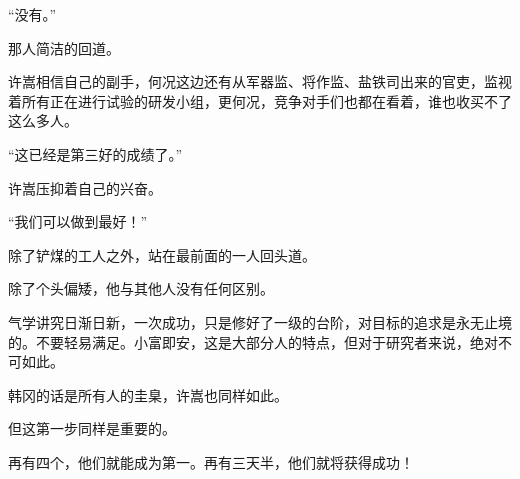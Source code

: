 “没有。”

那人简洁的回道。

许嵩相信自己的副手，何况这边还有从军器监、将作监、盐铁司出来的官吏，监视着所有正在进行试验的研发小组，更何况，竞争对手们也都在看着，谁也收买不了这么多人。

“这已经是第三好的成绩了。”

许嵩压抑着自己的兴奋。

“我们可以做到最好！”

除了铲煤的工人之外，站在最前面的一人回头道。

除了个头偏矮，他与其他人没有任何区别。

气学讲究日渐日新，一次成功，只是修好了一级的台阶，对目标的追求是永无止境的。不要轻易满足。小富即安，这是大部分人的特点，但对于研究者来说，绝对不可如此。

韩冈的话是所有人的圭臬，许嵩也同样如此。

但这第一步同样是重要的。

再有四个，他们就能成为第一。再有三天半，他们就将获得成功！

